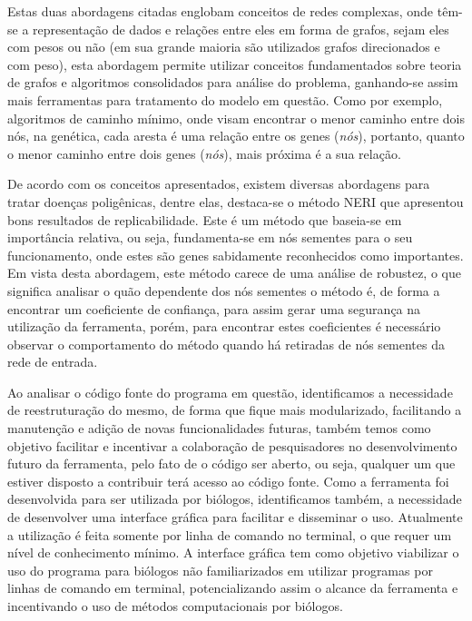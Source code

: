 Estas duas abordagens citadas englobam conceitos de redes complexas, onde têm-se a representação de dados e relações entre eles em forma de grafos, sejam eles com pesos ou não (em sua grande maioria são utilizados grafos direcionados e com peso), esta abordagem permite utilizar conceitos fundamentados sobre teoria de grafos e algoritmos consolidados para análise do problema, ganhando-se assim mais ferramentas para tratamento do modelo em questão.
Como por exemplo, algoritmos de caminho mínimo, onde visam encontrar o menor caminho entre dois nós, na genética, cada aresta é uma relação entre os genes (\textit{nós}), portanto, quanto o menor caminho entre dois genes (\textit{nós}), mais próxima é a sua relação. 

De acordo com os conceitos apresentados, existem diversas abordagens para tratar doenças poligênicas, dentre elas, destaca-se o método NERI que apresentou bons resultados de replicabilidade. Este é um método que baseia-se em importância relativa, ou seja, fundamenta-se em nós sementes para o seu funcionamento, onde estes são genes sabidamente reconhecidos como importantes. Em vista desta abordagem, este método carece de uma análise de robustez, o que significa analisar o quão dependente dos nós sementes o método é, de forma a encontrar um coeficiente de confiança, para assim gerar uma segurança na utilização da ferramenta, porém, para encontrar estes coeficientes é necessário observar o comportamento do método quando há retiradas de nós sementes da rede de entrada.

Ao analisar o código fonte do programa em questão, identificamos a necessidade de reestruturação do mesmo, de forma que fique mais modularizado, facilitando a manutenção e adição de novas funcionalidades futuras, também temos como objetivo facilitar e incentivar a colaboração de pesquisadores no desenvolvimento futuro da ferramenta, pelo fato de o código ser aberto, ou seja, qualquer um que estiver disposto a contribuir terá acesso ao código fonte.
Como a ferramenta foi desenvolvida para ser utilizada por biólogos, identificamos também, a necessidade de desenvolver uma interface gráfica para facilitar e disseminar o uso. Atualmente a utilização é feita somente por linha de comando no terminal, o que requer um nível de conhecimento mínimo. A interface gráfica tem como objetivo viabilizar o uso do programa para biólogos não familiarizados em utilizar programas por linhas de comando em terminal, potencializando assim o alcance da ferramenta e incentivando o uso de métodos computacionais por biólogos.


